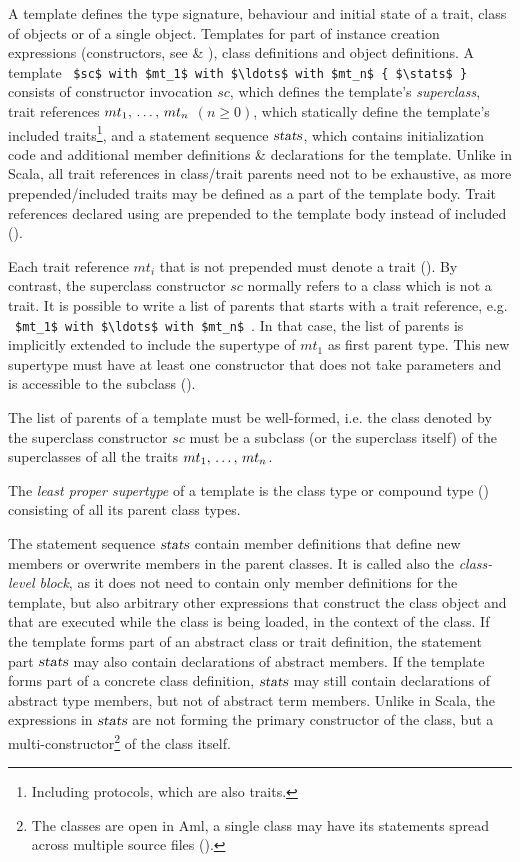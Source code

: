 A template defines the type signature, behaviour and initial state of a trait, class of objects or of a single object. Templates for part of instance creation expressions (constructors, see  \& ), class definitions and object definitions. A template ~\lstinline!$sc$ with $mt_1$ with $\ldots$ with $mt_n$ { $\stats$ }!~ consists of constructor invocation $sc$, which defines the template's {\em superclass}, trait references $mt_1 ,\, \ldots ,\, mt_n$ $(n \geq 0)$, which statically define the template's included traits\footnote{Including protocols, which are also traits.}, and a statement sequence $\mbox{\sl stats}$, which contains initialization code and additional member definitions \& declarations for the template. Unlike in Scala, all trait references in class/trait parents need not to be exhaustive, as more prepended/included traits may be defined as a part of the template body. Trait references declared using  are prepended to the template body instead of included (). 

Each trait reference $mt_i$ that is not prepended must denote a trait (). By contrast, the superclass constructor $sc$ normally refers to a class which is not a trait. It is possible to write a list of parents that starts with a trait reference, e.g. ~\lstinline!$mt_1$ with $\ldots$ with $mt_n$!~. In that case, the list of parents is implicitly extended to include the supertype of $mt_1$ as first parent type. This new supertype must have at least one constructor that does not take parameters and is accessible to the subclass (). 

The list of parents of a template must be well-formed, i.e. the class denoted by the superclass constructor $sc$ must be a subclass (or the superclass itself) of the superclasses of all the traits $mt_1 ,\, \ldots ,\, mt_n$. 

The {\em least proper supertype} of a template is the class type or compound type () consisting of all its parent class types. 

The statement sequence $\mbox{\sl stats}$ contain member definitions that define new members or overwrite members in the parent classes. It is called also the {\em class-level block}, as it does not need to contain only member definitions for the template, but also arbitrary other expressions that construct the class object and that are executed while the class is being loaded, in the context of the class. If the template forms part of an abstract class or trait definition, the statement part $\mbox{\sl stats}$ may also contain declarations of abstract members. If the template forms part of a concrete class definition, $\mbox{\sl stats}$ may still contain declarations of abstract type members, but not of abstract term members. Unlike in Scala, the expressions in $\mbox{\sl stats}$ are not forming the primary constructor of the class, but a multi-constructor\footnote{The classes are open in Aml, a single class may have its statements spread across multiple source files ().} of the class itself. 

